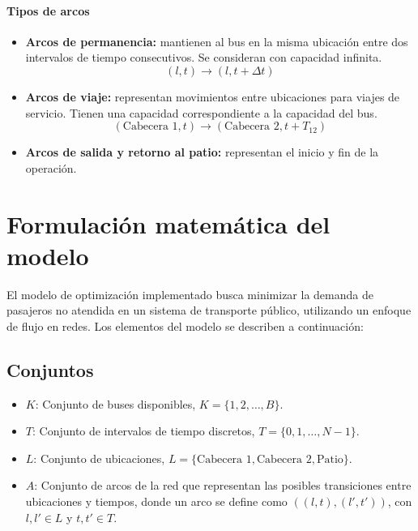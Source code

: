\documentclass[preprint,11pt]{elsarticle}
\begin{document}
\paragraph{Tipos de arcos}
\begin{itemize}
    \item \textbf{Arcos de permanencia:} mantienen al bus en la misma ubicación entre dos intervalos de tiempo consecutivos. Se consideran con capacidad infinita.
    \[
    (l,t) \rightarrow (l,t+\Delta t)
    \]
    \item \textbf{Arcos de viaje:} representan movimientos entre ubicaciones para viajes de servicio. Tienen una capacidad correspondiente a la capacidad del bus.
    \[
    (\text{Cabecera 1}, t) \rightarrow (\text{Cabecera 2}, t + T_{12})
    \]
    \item \textbf{Arcos de salida y retorno al patio:} representan el inicio y fin de la operación.
\end{itemize}

\section{Formulación matemática del modelo}

El modelo de optimización implementado busca minimizar la demanda de pasajeros no atendida en un sistema de transporte público, utilizando un enfoque de flujo en redes. Los elementos del modelo se describen a continuación:

\subsection{Conjuntos}
\begin{itemize}
    \item $K$: Conjunto de buses disponibles, $K = \{1, 2, \dots, B\}$.
    \item $T$: Conjunto de intervalos de tiempo discretos, $T = \{0, 1, \dots, N-1\}$.
    \item $L$: Conjunto de ubicaciones, $L = \{\text{Cabecera 1}, \text{Cabecera 2}, \text{Patio}\}$.
    \item $A$: Conjunto de arcos de la red que representan las posibles transiciones entre ubicaciones y tiempos, donde un arco se define como $((l, t), (l', t'))$, con $l, l' \in L$ y $t, t' \in T$.
\end{itemize}
\end{document}
